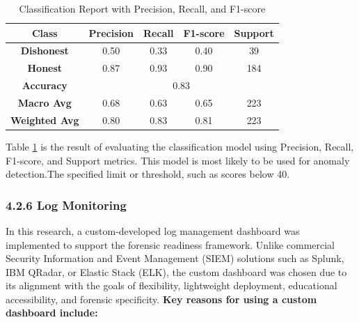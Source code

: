 \begin{table}[H]
	\centering
	\renewcommand{\arraystretch}{1.3} %
	\caption{Classification Report with Precision, Recall, and F1-score}
	\begin{tabular}{|c|c|c|c|c|}
		\hline
		\textbf{Class} & \textbf{Precision} & \textbf{Recall} & \textbf{F1-score} & \textbf{Support} \\
		\hline
		\textbf{Dishonest} & 0.50 & 0.33 & 0.40 & 39 \\
		\textbf{Honest}  & 0.87 & 0.93 & 0.90 & 184 \\
		\hline
		\textbf{Accuracy}  & \multicolumn{4}{c|}{0.83} \\
		\hline
		\textbf{Macro Avg} & 0.68 & 0.63 & 0.65 & 223 \\
		\textbf{Weighted Avg} & 0.80 & 0.83 & 0.81 & 223 \\
		\hline
	\end{tabular}
	\label{tab:classification_report}
\end{table}

Table \ref{tab:classification_report} is the result of evaluating the classification model using Precision, Recall, F1-score, and Support metrics. This model is most likely to be used for anomaly detection.The specified limit or threshold, such as scores below 40.


\subsubsection{4.2.6 Log Monitoring}
In this research, a custom-developed log management dashboard was implemented to support the forensic readiness framework. Unlike commercial Security Information and Event Management (SIEM) solutions such as Splunk, IBM QRadar, or Elastic Stack (ELK), the custom dashboard was chosen due to its alignment with the goals of flexibility, lightweight deployment, educational accessibility, and forensic specificity.
\textbf{Key reasons for using a custom dashboard include:}

